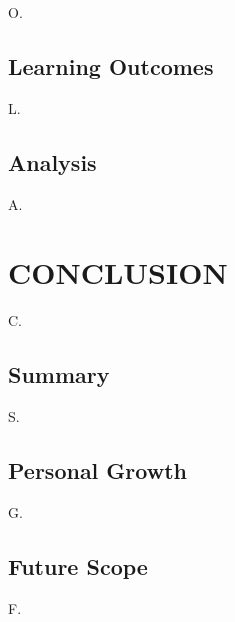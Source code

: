 \documentclass[12pt,a4paper]{report}
\begin{document}
O.


\section{Learning Outcomes}

L.


\section{Analysis}

A.




\chapter{CONCLUSION}


C.




\section{Summary}

S.


\section{Personal Growth}

G.


\section{Future Scope}

F.
\end{document}
